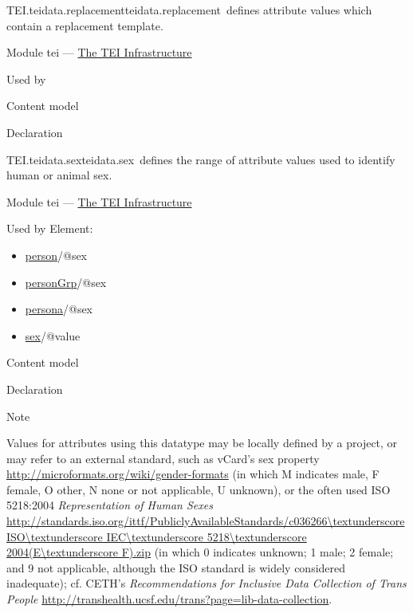 \begin{reflist}
\item[]\begin{specHead}{TEI.teidata.replacement}{teidata.replacement} defines attribute values which contain a replacement template.\end{specHead} 
    \item[{Module}]
  tei — \hyperref[ST]{The TEI Infrastructure}
    \item[{Used by}]
  
    \item[{Content model}]
    \item[{Declaration}]
\end{reflist}  
\begin{reflist}
\item[]\begin{specHead}{TEI.teidata.sex}{teidata.sex} defines the range of attribute values used to identify human or animal sex.\end{specHead} 
    \item[{Module}]
  tei — \hyperref[ST]{The TEI Infrastructure}
    \item[{Used by}]
  Element: \begin{itemize}
\item \hyperref[TEI.person]{person}/@sex
\item \hyperref[TEI.personGrp]{personGrp}/@sex
\item \hyperref[TEI.persona]{persona}/@sex
\item \hyperref[TEI.sex]{sex}/@value
\end{itemize} 
    \item[{Content model}]
    \item[{Declaration}]
    \item[{Note}]
  \par
Values for attributes using this datatype may be locally defined by a project, or may refer to an external standard, such as vCard's sex property \url{http://microformats.org/wiki/gender-formats} (in which M indicates male, F female, O other, N none or not applicable, U unknown), or the often used ISO 5218:2004 \textit{Representation of Human Sexes} \url{http://standards.iso.org/ittf/PubliclyAvailableStandards/c036266\textunderscore ISO\textunderscore IEC\textunderscore 5218\textunderscore 2004(E\textunderscore F).zip} (in which 0 indicates unknown; 1 male; 2 female; and 9 not applicable, although the ISO standard is widely considered inadequate); cf. CETH's \textit{Recommendations for Inclusive Data Collection of Trans People} \url{http://transhealth.ucsf.edu/trans?page=lib-data-collection}.
\end{reflist}  

